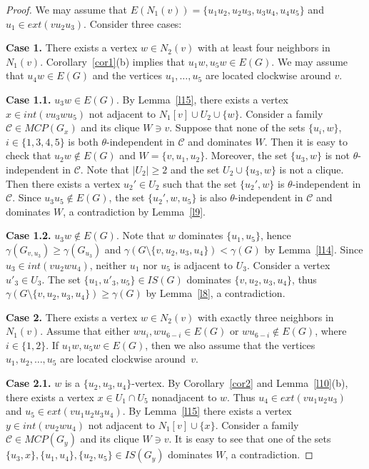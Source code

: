 \documentclass[12pt]{article}
\begin{document}
\begin{proof}

We may assume that $E(N_1(v)) = \{u_1u_2,u_2u_3,u_3u_4,u_4u_5\}$ and $u_1 \in ext(vu_2u_3)$. Consider three cases:


\textbf{Case 1.} There exists a vertex $w \in N_2(v)$ with at least four neighbors in $N_1(v)$. Corollary~\ref{cor1}(b) implies that $u_1w,u_5w \in E(G)$. We may assume that $u_4w \in E(G)$ and the vertices $u_1,\ldots,u_5$ are located clockwise around $v$.

\textbf{Case 1.1.} $u_3w \in E(G)$. By Lemma~\ref{l15}, there exists a vertex $x \in int(vu_3wu_5)$ not adjacent to $N_1[v] \cup U_2 \cup \{w\}$. Consider a family $\mathcal{C} \in MCP(G_x)$ and its clique $W \ni v$. Suppose that none of the sets $\{u_i,w\}$, $i \in \{1,3,4,5\}$ is both $\theta$-independent in $\mathcal{C}$ and dominates $W$. Then it is easy to check that $u_2w \notin E(G)$ and $W = \{v,u_1,u_2\}$. Moreover, the set $\{u_3,w\}$ is not $\theta$-independent in $\mathcal{C}$. Note that $|U_2| \geq 2$ and the set $U_2 \cup \{u_3,w\}$ is not a clique. Then there exists a vertex $u_2' \in U_2$ such that the set $\{u_2',w\}$ is $\theta$-independent in $\mathcal{C}$. Since $u_3u_5 \notin E(G)$, the set $\{u_2',w,u_5\}$ is also $\theta$-independent in $\mathcal{C}$ and dominates $W$, a contradiction by Lemma~\ref{l9}.

\textbf{Case 1.2.} $u_3w \notin E(G)$. Note that $w$ dominates $\{u_1,u_5\}$, hence $\gamma(G_{v,u_3}) \geq \gamma(G_{u_3})$ and $\gamma(G \setminus \{v,u_2,u_3,u_4\}) < \gamma(G)$ by Lemma~\ref{l14}. Since $u_3 \in int(vu_2wu_4)$, neither $u_1$ nor $u_5$ is adjacent to $U_3$. Consider a vertex $u'_3 \in U_3$. The set $\{u_1,u'_3,u_5\} \in IS(G)$ dominates $\{v,u_2,u_3,u_4\}$, thus $\gamma(G \setminus \{v,u_2,u_3,u_4\}) \geq \gamma(G)$ by Lemma~\ref{l8}, a contradiction.

\textbf{Case 2.} There exists a vertex $w \in N_2(v)$ with exactly three neighbors in $N_1(v)$. Assume that either $wu_i,wu_{6-i} \in E(G)$ or $wu_{6-i} \notin E(G)$, where $i \in \{1,2\}$. If $u_1w,u_5w \in E(G)$, then we also assume that the vertices $u_1,u_2,\ldots,u_5$ are located clockwise around~$v$.

\textbf{Case 2.1.} $w$ is a $\{u_2,u_3,u_4\}$-vertex. By Corollary~\ref{cor2} and Lemma~\ref{l10}(b), there exists a vertex $x \in U_1 \cap U_5$ nonadjacent to $w$. Thus $u_4 \in ext(vu_1u_2u_3)$ and $u_5 \in ext(vu_1u_2u_3u_4)$.  By Lemma~\ref{l15} there exists a vertex $y \in int(vu_2wu_4)$ not adjacent to $N_1[v] \cup \{x\}$. Consider a family $\mathcal{C} \in MCP(G_y)$ and its clique $W \ni v$. It is easy to see that one of the sets $\{u_3,x\}, \{u_1,u_4\}, \{u_2,u_5\} \in IS(G_y)$ dominates $W$, a contradiction.


\end{proof}
\end{document}
